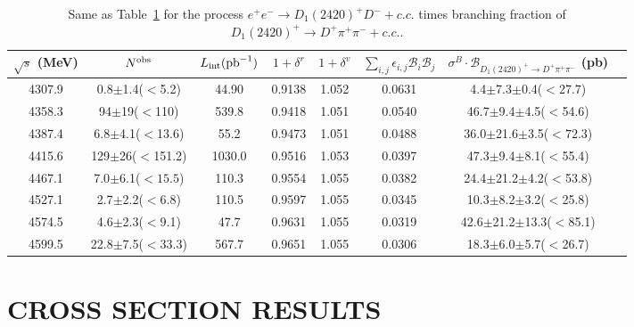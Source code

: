 \documentclass[aps,preprint,superscriptaddress,12pt,tightenlines]{revtex4}
\begin{document}
\begin{table}[htbp]
\caption{Same as Table~\ref{RCFDpD1} for the process
$e^{+}e^{-}\to D_{1}(2420)^{+}D^{-}+c.c.$ times branching fraction of $D_{1}(2420)^{+}\rightarrow D^{+}\pi^{+}\pi^{-}+c.c.$.}
 \label{RCFDpD1}
\begin{tabular}{c c c c c c c c}
\hline \hline
 $\sqrt{s}$ (MeV)      &$N^{\rm obs}$ &$L_{\rm int}({\rm pb}^{-1})$
 &$1+\delta^{r}$  &$1+\delta^{v}$  &$\sum_{i,j}\epsilon_{i,j} \mathcal{B}_{i}\mathcal{B}_{j}$
 &$\sigma^{B}\cdot\mathcal{B}_{D_{1}(2420)^{+}\to D^{+}\pi^{+}\pi^{-}}$ (pb) \\
    \hline
     4307.9&      0.8$\pm$1.4($<$5.2)  &44.90   &0.9138  &1.052  &0.0631   &4.4$\pm$7.3$\pm$0.4($<$27.7)    \\
     4358.3&      94$\pm$19($<$110)    &539.8   &0.9418  &1.051  &0.0540   &46.7$\pm$9.4$\pm$4.5($<$54.6)           \\
     4387.4&      6.8$\pm$4.1($<$13.6) &55.2    &0.9473  &1.051  &0.0488   &36.0$\pm$21.6$\pm$3.5($<72.3$) \\
     4415.6&      129$\pm$26($<$151.2) &1030.0  &0.9516  &1.053  &0.0397   &47.3$\pm$9.4$\pm$8.1($<$55.4)           \\
     4467.1&      7.0$\pm$6.1($<15.5$) &110.3   &0.9554  &1.055  &0.0382   &24.4$\pm$21.2$\pm$4.2($<$53.8)   \\
     4527.1&      2.7$\pm$2.2($<6.8$)  &110.5   &0.9597  &1.055  &0.0345   &10.3$\pm$8.2$\pm$3.2($<$25.8)   \\
     4574.5&      4.6$\pm$2.3($<$9.1)  &47.7    &0.9631  &1.055  &0.0319   &42.6$\pm$21.2$\pm$13.3($<$85.1)   \\
     4599.5&      22.8$\pm$7.5($<$33.3)&567.7   &0.9651  &1.055  &0.0306   &18.3$\pm$6.0$\pm$5.7($<$26.7)     \\
    \hline \hline
\end{tabular}
\end{table}

\section{CROSS SECTION RESULTS}
\end{document}
